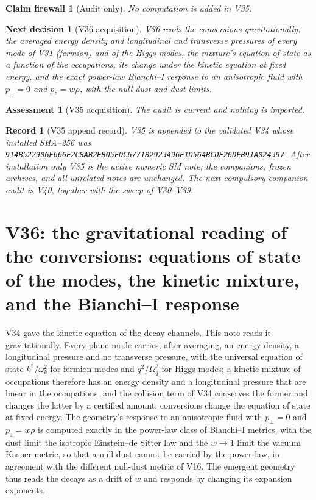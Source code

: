 \documentclass[11pt]{article}
\newtheorem{firewall}[theorem]{Claim firewall}
\newtheorem{decision}[theorem]{Next decision}
\newtheorem{assessment}[theorem]{Assessment}
\newtheorem{record}[theorem]{Record}
\theoremstyle{remark}
\begin{document}
\begin{firewall}[Audit only]
\label{fire:v20v35}
No computation is added in V35.
\end{firewall}

\begin{decision}[V36 acquisition]
\label{dec:v20v35-next}
V36 reads the conversions gravitationally: the averaged energy
density and longitudinal and transverse pressures of every mode of
V31 (fermion) and of the Higgs modes, the mixture's equation of
state as a function of the occupations, its change under the
kinetic equation at fixed energy, and the exact power-law Bianchi--I
response to an anisotropic fluid with \(p_\perp=0\) and
\(p_z=w\rho\), with the null-dust and dust limits.
\end{decision}

\begin{assessment}[V35 acquisition]
\label{ass:v20v35}
The audit is current and nothing is imported.
\end{assessment}

\begin{record}[V35 append record]
\label{rec:v20v35}
V35 is appended to the validated V34 whose installed SHA--256 was
\texttt{914B522906F666E2C8AB2E805FDC6771B2923496E1D564BCDE26DEB91A024397}.
After installation only V35 is the active numeric SM note; the
companions, frozen archives, and all unrelated notes are unchanged.
The next compulsory companion audit is V40, together with the sweep
of V30--V39.
\end{record}


\section{V36: the gravitational reading of the conversions: equations of state of the modes, the kinetic mixture, and the Bianchi--I response}
\label{sec:v20v36}

V34 gave the kinetic equation of the decay channels.  This note
reads it gravitationally.  Every plane mode carries, after
averaging, an energy density, a longitudinal pressure and no
transverse pressure, with the universal equation of state
\(k^2/\omega_k^2\) for fermion modes and \(q^2/\Omega_q^2\) for Higgs
modes; a kinetic mixture of occupations therefore has an energy
density and a longitudinal pressure that are linear in the
occupations, and the collision term of V34 conserves the former and
changes the latter by a certified amount: conversions change the
equation of state at fixed energy.  The geometry's response to an
anisotropic fluid with \(p_\perp=0\) and \(p_z=w\rho\) is computed
exactly in the power-law class of Bianchi--I metrics, with the dust
limit the isotropic Einstein--de Sitter law and the \(w\to1\) limit
the vacuum Kasner metric, so that a null dust cannot be carried by
the power law, in agreement with the different null-dust metric of
V16.  The emergent geometry thus reads the decays as a drift of
\(w\) and responds by changing its expansion exponents.
\end{document}
